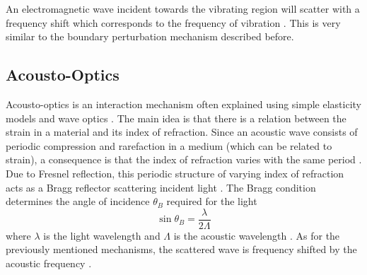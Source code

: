 \documentclass[11pt,twoside]{eitExjobb}
\begin{document}
	An electromagnetic wave incident towards the vibrating region will scatter with a frequency shift which corresponds to the frequency of vibration \cite{Top2014}. This is very similar to the boundary perturbation mechanism described before.
	
	
	\subsection{Acousto-Optics}
	Acousto-optics is an interaction mechanism often explained using simple elasticity models and wave optics \cite{Saleh2007}\cite{Korpel1981}. The main idea is that there is a relation between the strain in a material and its index of refraction. Since an acoustic wave consists of periodic compression and rarefaction in a medium (which can be related to strain), a consequence is that the index of refraction varies with the same period \cite{Saleh2007}. Due to Fresnel reflection, this periodic structure of varying index of refraction acts as a Bragg reflector scattering incident light \cite{Saleh2007}. The Bragg condition determines the angle of incidence $\theta_B$ required for the light
	\begin{equation*}
		\sin{\theta_B} = \frac{\lambda}{2\Lambda}
	\end{equation*}
	where $\lambda$ is the light wavelength and $\Lambda$ is the acoustic wavelength \cite{Saleh2007}. As for the previously mentioned mechanisms, the scattered wave is frequency shifted by the acoustic frequency \cite{Korpel1988}.
	
\end{document}
